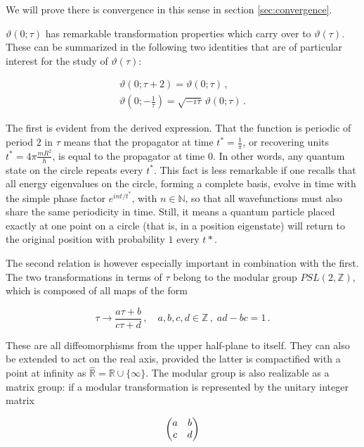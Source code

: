 \documentclass{article}
\newcommand{\T}{\ensuremath{\vartheta}}
\begin{document}
We will prove there is convergence in this sense in section \ref{sec:convergence}.

$\vartheta(0;\tau)$ has remarkable transformation properties which carry over to $\T(\tau)$. These can be summarized in the following two identities that are of particular interest for the study of $\T(\tau)$:

\begin{align}
    \vartheta(0; \tau + 2) = \vartheta(0; \tau)\,, \label{t2map}\\
    \vartheta(0; -\tfrac{1}{\tau}) = \sqrt{-i\tau} \, \vartheta(0; \tau)\,. \label{smap}
\end{align}

The first is evident from the derived expression. That the function is periodic of period $2$ in $\tau$ means that the propagator at time $t^* = \frac{1}{\pi}$, or recovering units $t^* = 4\pi \frac{mR^2}{\hbar}$, is equal to the propagator at time $0$. In other words, any quantum state on the circle repeats every $t^*$. This fact is less remarkable if one recalls that all energy eigenvalues on the circle, forming a complete basis, evolve in time with the simple phase factor $e^{int/t^*}$, with $n\in \mathbb{N}$, so that all wavefunctions must also share the same periodicity in time. Still, it means a quantum particle placed exactly at one point on a circle (that is, in a position eigenstate) will return to the original position with probability $1$ every $t*$.

\newcommand{\modg}{PSL(2,\mathbb{Z})}

The second relation is however especially important in combination with the first. The two transformations in terms of $\tau$ belong to the modular group $\modg$, which is composed of all maps of the form

\begin{equation}
    \tau \rightarrow \frac{a \tau + b}{c\tau + d}\,, \quad a,b,c,d \in \mathbb{Z}\,,\; ad - bc = 1\,.
\end{equation}

These are all diffeomorphisms from the upper half-plane to itself. They can also be extended to act on the real axis, provided the latter is compactified with a point at infinity as $\hat{\mathbb{R}} = \mathbb{R} \cup \{\infty\}$. The modular group is also realizable as a matrix group: if a modular transformation is represented by the unitary integer matrix

\begin{equation}
    \mqty( a & b \\ c & d)
\end{equation}
\end{document}
